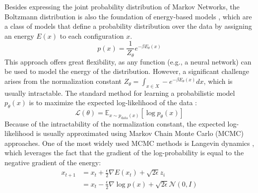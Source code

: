 Besides expressing the joint probability distribution of Markov Networks, the Boltzmann distribution is also the foundation of energy-based models \cite{teh_ebm_2003}, which are a class of models that define a probability distribution over the data by assigning an energy $E(x)$ to each configuration $x$.
\begin{equation*}
    p(x) = \frac{1}{Z_{\theta}} e^{-\beta E_{\theta}(x)}
\end{equation*}
This approach offers great flexibility, as any function (e.g., a neural network) can be used to model the energy of the distribution. However, a significant challenge arises from the normalization constant $Z_{\theta} = \int_{x \in X} -e^{-\beta E_{\theta}(x)} dx$, which is usually intractable. The standard method for learning a probabilistic model $p_{\theta}(x)$ is to maximize the expected log-likelihood of the data \cite{song_ebm_2021}:
\begin{equation}
    \mathcal{L}(\theta) = \mathbb{E}_{x \sim p_{\text{data}}(x)}[\log p_{\theta}(x)]
\end{equation}
Because of the intractability of the normalization constant, the expected log-likelihood is usually approximated using Markov Chain Monte Carlo (MCMC) approaches. One of the most widely used MCMC methods is Langevin dynamics \cite{parisi_langevin_1980}, which leverages the fact that the gradient of the log-probability is equal to the negative gradient of the energy:
\begin{align*}
    x_{t+1} & = x_t + \frac{\epsilon}{2} \nabla E(x_t) + \sqrt{2 \epsilon} z_i                  \\
            & = x_t - \frac{\epsilon}{2} \nabla \log p(x) + \sqrt{2 \epsilon} \mathcal{N}(0, I)
\end{align*}
